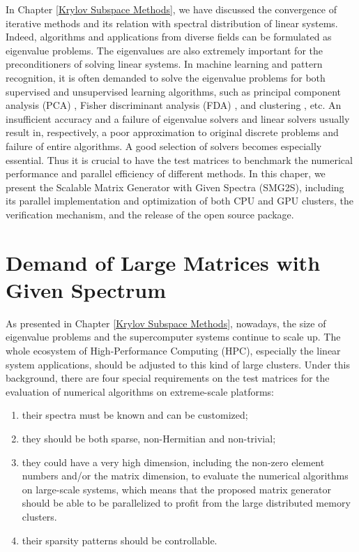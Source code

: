 \begin{displayquote}
	\textsf{In Chapter \ref{Krylov Subspace Methods}, we have discussed the convergence of iterative methods and its relation with spectral distribution of linear systems. Indeed, algorithms and applications from diverse fields can be formulated as eigenvalue problems. The eigenvalues are also extremely important for the preconditioners of solving linear systems. In machine learning and pattern recognition, it is often demanded to solve the eigenvalue problems for both supervised and unsupervised learning algorithms, such as principal component analysis (PCA) \cite{croux2000principal}, Fisher discriminant analysis (FDA) \cite{berkes2005handwritten}, and clustering \cite{fender2017parallel}, etc. An insufficient accuracy and a failure of eigenvalue solvers and linear solvers usually result in, respectively, a poor approximation to original discrete problems and failure of entire algorithms.  A good selection of solvers becomes especially essential. Thus it is crucial to have the test matrices to benchmark the numerical performance and parallel efficiency of different methods. In this chaper, we present the Scalable Matrix Generator with Given Spectra (SMG2S), including its parallel implementation and optimization of both CPU and GPU clusters, the verification mechanism, and the release of the open source package.}
\end{displayquote}

\vspace{0.6in}

\section{Demand of Large Matrices with Given Spectrum}

As presented in Chapter \ref{Krylov Subspace Methods}, nowadays, the size of eigenvalue problems and the supercomputer systems continue to scale up. The whole ecosystem of High-Performance Computing (HPC), especially the linear system applications, should be adjusted to this kind of large clusters. Under this background, there are four special requirements on the test matrices for the evaluation of numerical algorithms on extreme-scale platforms: 

\begin{enumerate}[label=(\arabic*)]
	\item their spectra must be known and can be customized;
	\item they should be both sparse, non-Hermitian and non-trivial;
	\item they could have a very high dimension, including the non-zero element numbers and/or the matrix dimension, to evaluate the numerical algorithms on large-scale systems, which means that the proposed matrix generator should be able to be parallelized to profit from the large distributed memory clusters.
	\item their sparsity patterns should be controllable.
\end{enumerate}

